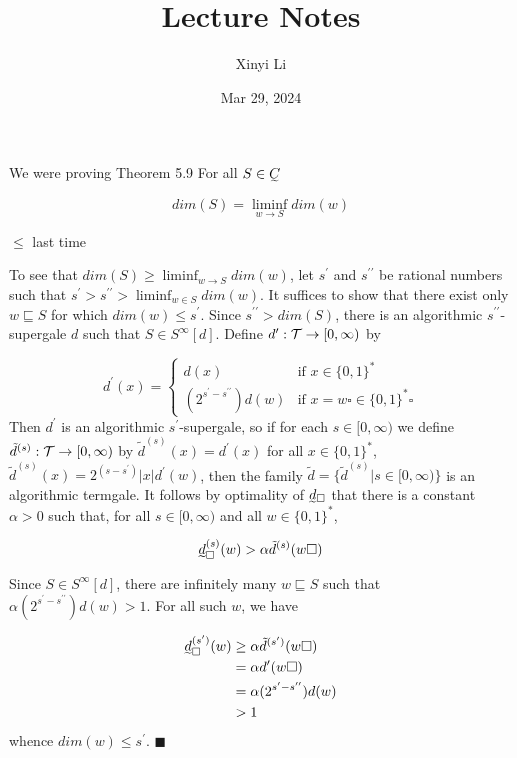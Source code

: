 \documentclass[12pt]{article}
\title{Lecture Notes}
\author{Xinyi Li}
\date{Mar 29, 2024}
\theoremstyle{definition}
\begin{document}
\maketitle

We were proving Theorem 5.9 For all $S \in \undertilde{C}$

$$dim(S) = \liminf_{w \to S} dim(w)$$

$\le$ last time

To see that $dim(S) \ge \liminf_{w \to S} dim(w)$, let $s^\prime$ and $s^{\prime\prime}$ be rational numbers such that $s^\prime > s^{\prime\prime} > \liminf_{w \in S} dim(w)$. It suffices to show that there exist only $w \sqsubseteq S$ for which $dim(w) \le s^\prime$. Since $s^{\prime\prime} > dim(S)$, there is an algorithmic $s^{\prime\prime}$-supergale $d$ such that $S \in S^\infty [d]$. Define $d^\prime: {\cal T} \to [0, \infty)$ by

$$
    d^\prime(x) = \begin{cases}
        d(x)                                  & \text{if } x \in \{0, 1\}^*                     \\
        (2^{s^\prime - s^{\prime\prime}})d(w) & \text{if } x = w \square \in \{0, 1\}^* \square
    \end{cases}
$$
Then $d^\prime$ is an algorithmic $s^\prime$-supergale, so if for each $s \in [0, \infty)$ we define $\tilde{d}^{(s)}: {\cal T} \to [0, \infty)$ by $\tilde{d}^{(s)}(x) = d^\prime(x)$ for all $x \in \{0, 1\}^*$, $\tilde{d}^{(s)}(x) = 2^{(s - s^\prime)}|x|d^\prime(w)$, then the family $\tilde{d} = \{\tilde{d}^{(s)} | s \in [0, \infty)\}$ is an algorithmic termgale. It follows by optimality of $\undertilde{d}_\square$ that there is a constant $\alpha > 0$ such that, for all $s \in [0, \infty)$ and all $w \in \{0, 1\}^*$,

$$\undertilde{d}_\square^{(s)}(w) > \alpha \tilde{d}^{(s)}(w \square)$$

Since $S \in S^\infty [d]$, there are infinitely many $w \sqsubseteq S$ such that $\alpha (2^{s^\prime - s^{\prime\prime}})d(w) > 1$. For all such $w$, we have

$$
    \begin{aligned}
        \undertilde{d}_\square^{(s^\prime)}(w) & \ge \alpha \tilde{d}^{(s^\prime)}(w \square)   \\
                                               & = \alpha d^\prime(w \square)                   \\
                                               & = \alpha (2^{s^\prime - s^{\prime\prime}})d(w) \\
                                               & > 1
    \end{aligned}
$$
whence $dim(w) \le s^\prime$. $\blacksquare$
\end{document}
